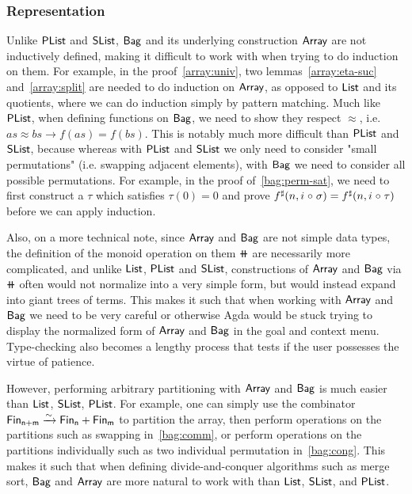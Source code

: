 \subsubsection{Representation}\label{bag:rep}
Unlike $\operatorname{\mathsf{PList}}$ and $\operatorname{\mathsf{SList}}$, $\operatorname{\mathsf{Bag}}$ and its underlying construction $\operatorname{\mathsf{Array}}$ are not inductively defined,
making it difficult to work with when trying to do induction on them. For example,
in the proof~\ref{array:univ}, two lemmas~\ref{array:eta-suc} and~\ref{array:split} are needed to do
induction on $\operatorname{\mathsf{Array}}$, as opposed to $\operatorname{\mathsf{List}}$ and its quotients, where we can do induction simply by
pattern matching. Much like $\operatorname{\mathsf{PList}}$, when defining functions on $\operatorname{\mathsf{Bag}}$, we need to show they respect
$\approx$, i.e. $as \approx bs \to f(as) = f(bs)$. This is notably much more difficult than
$\operatorname{\mathsf{PList}}$ and $\operatorname{\mathsf{SList}}$, because whereas with $\operatorname{\mathsf{PList}}$ and $\operatorname{\mathsf{SList}}$ we only need to consider "small permutations"
(i.e. swapping adjacent elements), with $\operatorname{\mathsf{Bag}}$ we need to consider all possible permutations. For example,
in the proof of~\ref{bag:perm-sat}, we need to first construct a $\tau$ which satisfies $\tau(0) = 0$ and prove
${f}^{\sharp}(n, i \mathrel{\circ} \sigma) = {f}^{\sharp}(n, i \mathrel{\circ} \tau)$ before we can apply induction.

Also, on a more technical note, since $\operatorname{\mathsf{Array}}$ and $\operatorname{\mathsf{Bag}}$ are not simple data types, the definition of
the monoid operation on them $\doubleplus$ are necessarily more complicated, and unlike $\operatorname{\mathsf{List}}$, $\operatorname{\mathsf{PList}}$
and $\operatorname{\mathsf{SList}}$, constructions of $\operatorname{\mathsf{Array}}$ and $\operatorname{\mathsf{Bag}}$ via $\doubleplus$ often would not normalize into a
very simple form, but would instead expand into giant trees of terms. This makes it such that when working
with $\operatorname{\mathsf{Array}}$ and $\operatorname{\mathsf{Bag}}$ we need to be very careful or otherwise Agda would be stuck trying to display
the normalized form of $\operatorname{\mathsf{Array}}$ and $\operatorname{\mathsf{Bag}}$ in the goal and context menu. Type-checking also becomes a lengthy
process that tests if the user possesses the virtue of patience.

However, performing arbitrary partitioning with $\operatorname{\mathsf{Array}}$ and $\operatorname{\mathsf{Bag}}$ is much easier than
$\operatorname{\mathsf{List}}$, $\operatorname{\mathsf{SList}}$, $\operatorname{\mathsf{PList}}$. For example,
one can simply use the combinator $\Fin[n+m] \xto{\sim} \Fin[n] + \Fin[m]$ to partition the array,
then perform operations on the partitions such as swapping in~\ref{bag:comm},
or perform operations on the partitions individually such as two individual permutation in~\ref{bag:cong}.
This makes it such that when defining divide-and-conquer algorithms such as merge sort,
$\operatorname{\mathsf{Bag}}$ and $\operatorname{\mathsf{Array}}$ are more natural to work with than $\operatorname{\mathsf{List}}$, $\operatorname{\mathsf{SList}}$, and $\operatorname{\mathsf{PList}}$.
